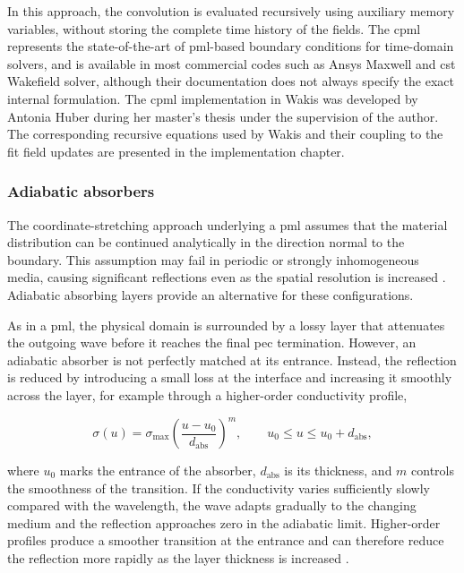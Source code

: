 In this approach, the convolution is evaluated recursively using auxiliary memory variables, without storing the complete time history of the fields. The \gls{cpml} represents the state-of-the-art of \gls{pml}-based boundary conditions for time-domain solvers, and is available in most commercial codes such as Ansys Maxwell and \gls{cst} Wakefield solver, although their documentation does not always specify the exact internal formulation. The \gls{cpml} implementation in Wakis was developed by Antonia Huber during her master's thesis under the supervision of the author. The
corresponding recursive equations used by Wakis and their coupling to the \gls{fit} field updates are presented in the implementation chapter.


\subsubsection{Adiabatic absorbers}
\label{sec:bc_adiabatic_absorber}

The coordinate-stretching approach underlying a \gls{pml} assumes that the material distribution can be continued analytically in the direction normal to the boundary. This assumption may fail in periodic or strongly inhomogeneous media, causing significant reflections even as the spatial resolution is increased \cite{oskooi_failure_2008}. Adiabatic absorbing layers provide an alternative for these configurations.

As in a \gls{pml}, the physical domain is surrounded by a lossy layer that attenuates the outgoing wave before it reaches the final \gls{pec} termination. However, an adiabatic absorber is not perfectly matched at its entrance. Instead, the reflection is reduced by introducing a small loss at the interface and increasing it smoothly across the layer, for example through a higher-order conductivity profile,

\begin{equation}
\sigma(u)
=
\sigma_{\max}
\left(
\frac{u-u_0}{d_{\mathrm{abs}}}
\right)^m,
\qquad
u_0\leq u\leq u_0+d_{\mathrm{abs}},
\label{eq:adiabatic_conductivity_profile}
\end{equation}

where $u_0$ marks the entrance of the absorber, $d_{\mathrm{abs}}$ is its thickness, and $m$ controls the smoothness of the transition. If the conductivity varies sufficiently slowly compared with the wavelength, the wave adapts gradually to the changing medium and the reflection approaches zero in the adiabatic limit. Higher-order profiles produce a smoother transition at the entrance and can therefore reduce the reflection more rapidly as the layer thickness is increased
\cite{oskooi_failure_2008}.

